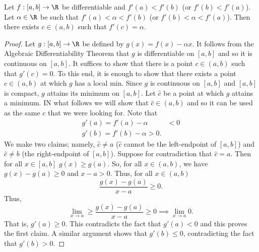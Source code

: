 \begin{theorem}
    Let \( f: [a,b] \to \R  \) be differentiable and \( f'(a) < f'(b) \) (or \( f'(b) < f'(a) \)). Let \( \alpha \in \R  \) be such that \( f'(a) < \alpha < f'(b)  \) (or \( f'(b) < \alpha < f'(a) \)). Then there exists \( c \in (a,b) \) such that \( f'(c) = \alpha \).
\end{theorem}
\begin{proof}
    Let \( g:[a,b] \to \R  \) be defined by \( g(x) = f(x) - \alpha x  \). It follows from the Algebraic Differentiability Theorem that \( g  \) is differentiable on \( [a,b] \) and so it is continuous on \( [a,b] \). It suffices to show that there is a point \( c \in (a,b) \) such that \( g'(c) = 0 \). To this end, it is enough to show that there exists a point \( c \in (a,b) \) at which \( g  \) has a local min. Since \( g  \) is continuous on \( [a,b] \) and \( [a,b]  \) is compact, \( g  \) attains its minimum on \( [a,b] \). Let \( \hat{c} \) be a point at which \( g  \) attains a minimum. IN what follows we will show that \( \hat{c} \in (a,b) \) and so it can be used as the same \( c  \) that we were looking for. Note that  
    \begin{align*}
        g'(a) = f'(a) - \alpha &<  0 \\
        g'(b) = f'(b) - \alpha > 0. 
    \end{align*}
    We make two claims; namely, \( \hat{c} \neq a  \) (\( \hat{c}  \) cannot be the left-endpoint of \( [a,b] \)) and \( \hat{c} \neq b  \) (the right-endpoint of \( [a,b] \)). Suppose for contradiction that \( \hat{c}= a  \). Then for all \( x \in [a,b] \) \( g(x) \geq g(a) \). So, for all \( x \in (a,b) \), we have \( g(x) - g(a) \geq 0  \) and \( x - a > 0  \). Thus, for all \( x \in (a,b) \)
    \[  \frac{ g(x) - g(a) }{ x - a  }  \geq 0.  \]
    Thus, 
    \[  \lim_{ x \to a }  \geq \frac{ g(x) - g(a) }{  x - a  }  \geq 0 \implies \lim_{ x \to a  }  0.   \]
    That is, \( g'(a) \geq 0  \). This contradicts the fact that \( g'(a) < 0 \) and this proves the first claim.
    A similar argument shows that \( g'(b) \leq 0  \), contradicting the fact that \( g'(b) > 0  \).
\end{proof}






